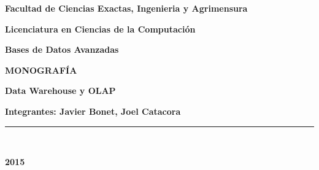 \documentclass[a4paper,11pt]{article}
\title{}
\author{}
\begin{document}

  \begin{titlepage}

    \begin{center}

      \begin{Huge}
        \textbf{Facultad de Ciencias Exactas, Ingenieria y Agrimensura}\\  
      \end{Huge}
      \vspace*{0.5in}
      \begin{huge}
        \textbf{Licenciatura en Ciencias de la Computación}\\
      \end{huge}
      \vspace*{0.5in}
      \begin{LARGE}
        \textbf{Bases de Datos Avanzadas}\\
      \end{LARGE}
      \vspace*{2.0in}
      \begin{Huge}
        \textbf{MONOGRAFÍA}\\
      \end{Huge}
      \vspace*{0.3in}
      \begin{Huge}
        \textbf{Data Warehouse y OLAP}\\
      \end{Huge}
      \vspace*{2.5in}
      \begin{Large}
        \textbf{Integrantes: Javier Bonet, Joel Catacora}\\
      \end{Large}
      \vspace*{0.1in}
      \rule{80mm}{0.1mm}\\
      \vspace*{0.1in}
      \begin{Large}
        \textbf{2015}\\
      \end{Large}

    \end{center}

  \end{titlepage}

\end{document}
